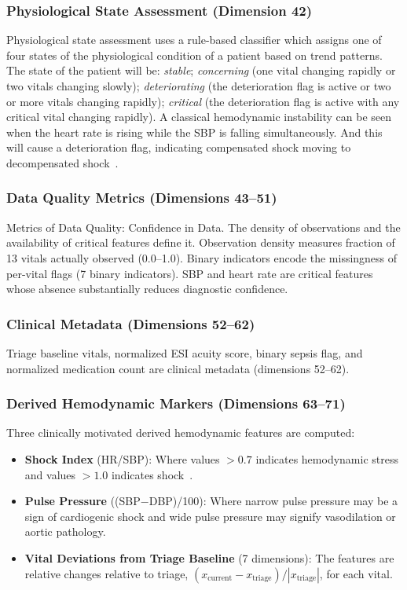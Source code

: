 \documentclass[conference]{IEEEtran}
\begin{document}
\subsubsection{Physiological State Assessment (Dimension 42)}
Physiological state assessment uses a rule-based classifier which assigns one of four states of the physiological condition of a patient based on trend patterns. The state of the patient will be: \textit{stable}; \textit{concerning} (one vital changing rapidly or two vitals changing slowly); \textit{deteriorating} (the deterioration flag is active or two or more vitals changing rapidly); \textit{critical} (the deterioration flag is active with any critical vital changing rapidly). A classical hemodynamic instability can be seen when the heart rate is rising while the SBP is falling simultaneously. And this will cause a deterioration flag, indicating compensated shock moving to decompensated shock~\cite{Hoot2008}.

\subsubsection{Data Quality Metrics (Dimensions 43--51)}
Metrics of Data Quality: Confidence in Data. The density of observations and the availability of critical features define it. Observation density measures fraction of 13 vitals actually observed (0.0--1.0). Binary indicators encode the missingness of per-vital flags (7 binary indicators). SBP and heart rate are critical features whose absence substantially reduces diagnostic confidence.

\subsubsection{Clinical Metadata (Dimensions 52--62)}
Triage baseline vitals, normalized ESI acuity score, binary sepsis flag, and normalized medication count are clinical metadata (dimensions 52--62).

\subsubsection{Derived Hemodynamic Markers (Dimensions 63--71)}
Three clinically motivated derived hemodynamic features are computed:
\begin{itemize}
    \item \textbf{Shock Index} (HR/SBP): Where values $>0.7$ indicates hemodynamic stress and values $>1.0$ indicates shock~\cite{Koch2019}.
    \item \textbf{Pulse Pressure} ((SBP$-$DBP)/100): Where narrow pulse pressure may be a sign of cardiogenic shock and wide pulse pressure may signify vasodilation or aortic pathology.
    \item \textbf{Vital Deviations from Triage Baseline} (7 dimensions): The features are relative changes relative to triage, $(x_{\text{current}} - x_{\text{triage}}) / |x_{\text{triage}}|$, for each vital.
\end{itemize}
\end{document}

